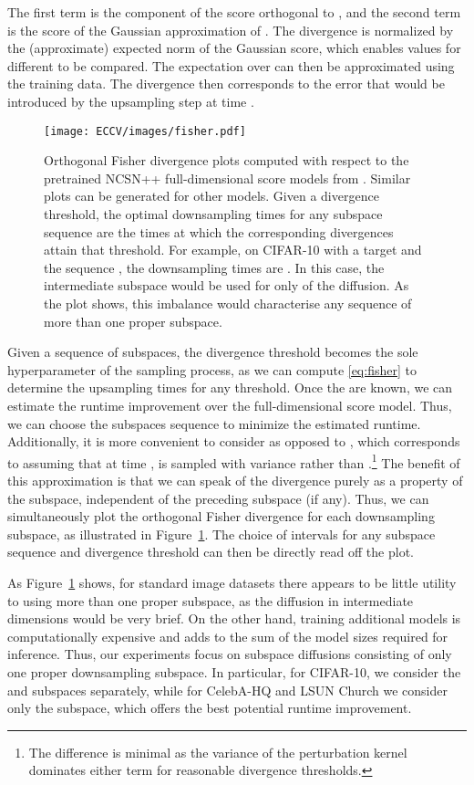 \documentclass{article}
\begin{document}
The first term is the component of the score orthogonal to , and the second term is the score of the Gaussian approximation of . The divergence is normalized by the (approximate) expected norm of the Gaussian score, which enables values for different  to be compared. The expectation over  can then be approximated using the training data. The divergence  then corresponds to the error that would be introduced by the upsampling step at time .

\begin{figure}[t!]
    \centering
    \texttt{[image: ECCV/images/fisher.pdf]}
    \caption{Orthogonal Fisher divergence plots computed with respect to the pretrained NCSN++ full-dimensional score models from \cite{song2021score}. Similar plots can be generated for other models. Given a divergence threshold, the optimal downsampling times  for any subspace sequence are the times at which the corresponding divergences attain that threshold. For example, on CIFAR-10 with a target  and the sequence , the downsampling times are . In this case, the intermediate  subspace would be used for only  of the diffusion. As the plot shows, this imbalance would characterise any sequence of more than one proper subspace.}
    \label{fig:fisher}
\end{figure}

Given a sequence of subspaces, the divergence threshold becomes the sole hyperparameter of the sampling process, as we can compute \eqref{eq:fisher} to determine the upsampling times  for any threshold. Once the  are known, we can estimate the runtime improvement over the full-dimensional score model. Thus, we can choose the subspaces sequence to minimize the estimated runtime. Additionally, it is more convenient to consider  as opposed to , which corresponds to assuming that at time ,  is sampled with variance  rather than .\footnote{The difference is minimal as the variance of the perturbation kernel dominates either term for reasonable divergence thresholds.} The benefit of this approximation is that we can speak of the divergence purely as a property of the subspace, independent of the preceding subspace (if any). Thus, we can simultaneously plot the orthogonal Fisher divergence for each downsampling subspace, as illustrated in Figure~\ref{fig:fisher}. The choice of intervals for any subspace sequence and divergence threshold can then be directly read off the plot.

As Figure~\ref{fig:fisher} shows, for standard image datasets there appears to be little utility to using more than one proper subspace, as the diffusion in intermediate dimensions would be very brief. On the other hand, training additional models is computationally expensive and adds to the sum of the model sizes required for inference. Thus, our experiments focus on subspace diffusions consisting of only one proper downsampling subspace. In particular, for CIFAR-10, we consider the  and  subspaces separately, while for CelebA-HQ and LSUN Church we consider only the  subspace, which offers the best potential runtime improvement.
\end{document}
